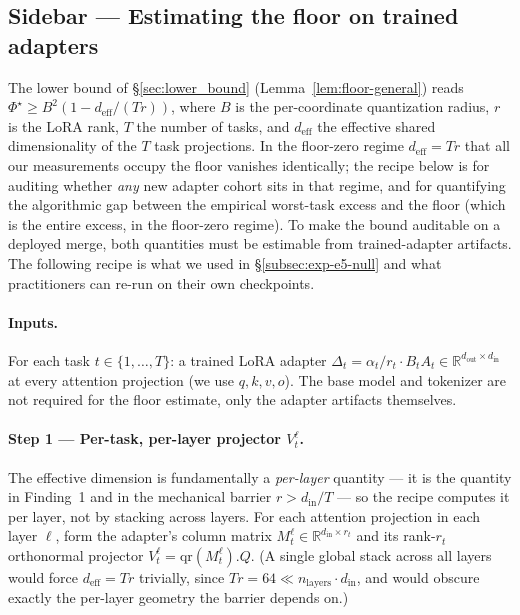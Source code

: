 
\subsection*{Sidebar — Estimating the floor on trained adapters}
\label{subsec:floor-recipe}

The lower bound of \S\ref{sec:lower_bound} (Lemma~\ref{lem:floor-general})
reads
$\Phi^\star \geq B^2 \left(1 - d_{\mathrm{eff}} / (Tr)\right)$,
where $B$ is the per-coordinate quantization radius, $r$ is the LoRA
rank, $T$ the number of tasks, and $d_{\mathrm{eff}}$ the effective
shared dimensionality of the $T$ task projections. In the floor-zero
regime $d_{\mathrm{eff}} = Tr$ that all our measurements occupy the
floor vanishes identically; the recipe below is for auditing whether
\emph{any} new adapter cohort sits in that regime, and for quantifying
the algorithmic gap between the empirical worst-task excess and the
floor (which is the entire excess, in the floor-zero regime). To make
the bound auditable on a deployed merge, both quantities must be
estimable from trained-adapter artifacts. The following recipe is what
we used in \S\ref{subsec:exp-e5-null} and what practitioners can
re-run on their own checkpoints.

\paragraph{Inputs.} For each task $t \in \{1, \dots, T\}$: a trained
LoRA adapter $\Delta_t = \alpha_t / r_t \cdot B_t A_t \in
\mathbb{R}^{d_{\mathrm{out}} \times d_{\mathrm{in}}}$ at every
attention projection (we use $q, k, v, o$). The base model and
tokenizer are not required for the floor estimate, only the adapter
artifacts themselves.

\paragraph{Step 1 --- Per-task, per-layer projector $V_t^\ell$.}
The effective dimension is fundamentally a \emph{per-layer} quantity
--- it is the quantity in Finding~1 and in the mechanical barrier
$r > d_{\mathrm{in}}/T$ --- so the recipe computes it per layer, not by
stacking across layers. For each attention projection in each layer
$\ell$, form the adapter's column matrix $M_t^\ell \in
\mathbb{R}^{d_{\mathrm{in}} \times r_t}$ and its rank-$r_t$ orthonormal
projector $V_t^\ell = \mathrm{qr}(M_t^\ell).Q$. (A single global stack
across all layers would force $d_{\mathrm{eff}} = Tr$ trivially, since
$Tr = 64 \ll n_{\mathrm{layers}} \cdot d_{\mathrm{in}}$, and would
obscure exactly the per-layer geometry the barrier depends on.)


